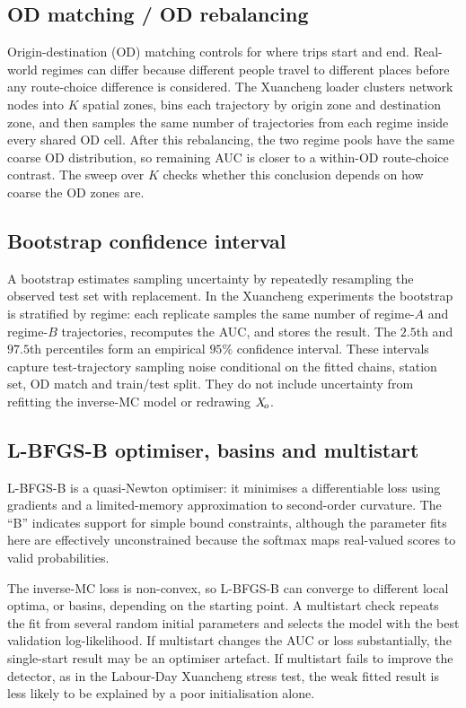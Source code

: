 \subsection{OD matching / OD rebalancing}
\label{app:od-primer}

Origin-destination (OD) matching controls for where trips start and end.
Real-world regimes can differ because different people travel to
different places before any route-choice difference is considered.
The Xuancheng loader clusters network nodes into $K$ spatial zones, bins
each trajectory by origin zone and destination zone, and then samples the
same number of trajectories from each regime inside every shared OD
cell. After this rebalancing, the two regime pools have the same coarse
OD distribution, so remaining AUC is closer to a within-OD route-choice
contrast. The sweep over $K$ checks whether this conclusion depends on
how coarse the OD zones are.

\subsection{Bootstrap confidence interval}
\label{app:bootstrap-primer}

A bootstrap estimates sampling uncertainty by repeatedly resampling the
observed test set with replacement. In the Xuancheng experiments the
bootstrap is stratified by regime: each replicate samples the same number
of regime-$A$ and regime-$B$ trajectories, recomputes the AUC, and stores
the result. The $2.5$th and $97.5$th percentiles form an empirical
$95\%$ confidence interval. These intervals capture test-trajectory
sampling noise conditional on the fitted chains, station set, OD match
and train/test split. They do not include uncertainty from refitting the
inverse-MC model or redrawing $X_{\!o}$.

\subsection{L-BFGS-B optimiser, basins and multistart}
\label{app:lbfgs-primer}

L-BFGS-B is a quasi-Newton optimiser: it minimises a differentiable loss
using gradients and a limited-memory approximation to second-order
curvature. The ``B'' indicates support for simple bound constraints,
although the parameter fits here are effectively unconstrained because
the softmax maps real-valued scores to valid probabilities.

The inverse-MC loss is non-convex, so L-BFGS-B can converge to different
local optima, or basins, depending on the starting point. A multistart
check repeats the fit from several random initial parameters and selects
the model with the best validation log-likelihood. If multistart changes
the AUC or loss substantially, the single-start result may be an
optimiser artefact. If multistart fails to improve the detector, as in
the Labour-Day Xuancheng stress test, the weak fitted result is less
likely to be explained by a poor initialisation alone.

